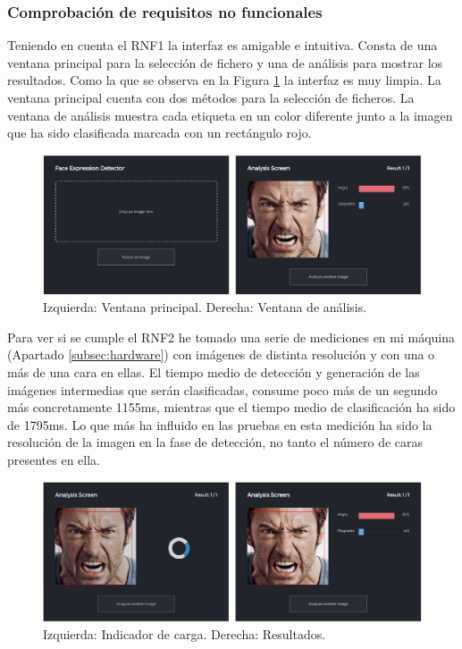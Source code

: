 \documentclass[a4paper,11pt]{book}
\begin{document}
\subsubsection{Comprobación de requisitos no funcionales}
Teniendo en cuenta el RNF1 la interfaz es amigable e intuitiva. Consta de una ventana principal para la selección de fichero y una de análisis para mostrar los resultados. Como la que se observa en la Figura \ref{fig:UI01} la interfaz es muy limpia. La ventana principal cuenta con dos métodos para la selección de ficheros. La ventana de análisis muestra cada etiqueta en un color diferente junto a la imagen que ha sido clasificada marcada con un rectángulo rojo.\\
\begin{figure}[h]
	\centering
	\includegraphics[width=0.9\linewidth]{imagenes/UI01}
	\caption[Interfaz de usuario]{Izquierda: Ventana principal. Derecha: Ventana de análisis.}
	\label{fig:UI01}
\end{figure}

Para ver si se cumple el RNF2 he tomado una serie de mediciones en mi máquina (Apartado \ref{subsec:hardware}) con imágenes de distinta resolución y con una o más de una cara en ellas. El tiempo medio de detección y generación de las imágenes intermedias que serán clasificadas, consume poco más de un segundo más concretamente 1155ms, mientras que el tiempo medio de clasificación ha sido de 1795ms. Lo que más ha influido en las pruebas en esta medición ha sido la resolución de la imagen en la fase de detección, no tanto el número de caras presentes en ella.\\
\begin{figure}[h]
\centering
\includegraphics[width=0.9\linewidth]{imagenes/loading}
\caption[Indicador de carga]{Izquierda: Indicador de carga. Derecha: Resultados.}
\label{fig:loading}
\end{figure}
\end{document}
